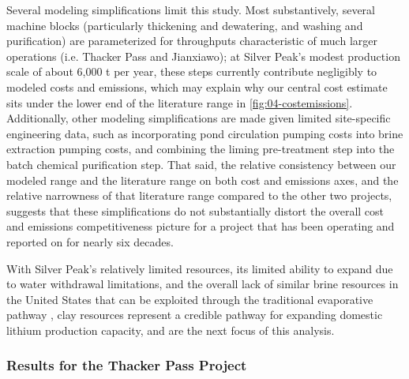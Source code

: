 Several modeling simplifications limit this study. Most substantively, several machine blocks (particularly thickening and dewatering, and washing and purification) are parameterized for throughputs characteristic of much larger operations (i.e. Thacker Pass and Jianxiawo); at Silver Peak's modest production scale of about 6,000 t  per year, these steps currently contribute negligibly to modeled costs and emissions, which may explain why our central cost estimate sits under the lower end of the literature range in \ref{fig:04-costemissions}. Additionally, other modeling simplifications are made given limited site-specific engineering data, such as incorporating pond circulation pumping costs into brine extraction pumping costs, and combining the liming pre-treatment step into the batch chemical purification step. That said, the relative consistency between our modeled range and the literature range on both cost and emissions axes, and the relative narrowness of that literature range compared to the other two projects, suggests that these simplifications do not substantially distort the overall cost and emissions competitiveness picture for a project that has been operating and reported on for nearly six decades.

With Silver Peak's relatively limited resources, its limited ability to expand due to water withdrawal limitations, and the overall lack of similar brine resources in the United States that can be exploited through the traditional evaporative pathway \cite{wesselkaemperOptimizationProcessingCosts2025}, clay resources represent a credible pathway for expanding domestic lithium production capacity, and are the next focus of this analysis. 

\subsubsection{Results for the Thacker Pass Project}\label{sec:04-thackerpass}


